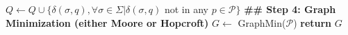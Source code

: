 {\begin{algorithm}
\begin{algorithmic}[1]
      		\EndIf 
      		\State $Q \gets Q\cup\{\delta(\sigma,q),\forall \sigma\in\Sigma|\delta(\sigma,q)$ not in any $p\in\mathcal{P}\}$
      	\EndFor
      	\State \textbf{\#\# Step 4: Graph Minimization (either Moore or Hopcroft)}
      	\State $G \gets$ GraphMin($\mathcal{P}$)
      	\State \textbf{return} $G$
      \EndProcedure
    \end{algorithmic}
  \end{algorithm}
%
%
%
%
%
}
